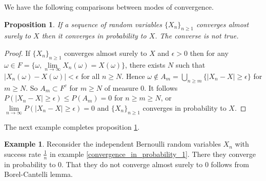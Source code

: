 \documentclass[12pt]{amsart}
\newtheorem{proposition}[theorem]{Proposition}
\theoremstyle{definition}
\newtheorem{example}[theorem]{Example}
\begin{document}
We have the following comparisons between modes of convergence.
\begin{proposition} \label{almost_sure_implies_probability} If  a sequence of random variables $\{X_n\}_{n \geq 1}$ converges almost surely to $X$ then it converges in probability to $X$. The converse is not true.
\end{proposition}
\begin{proof} If $\{X_n\}_{n \geq 1}$ converges almost surely to $X$ and $\epsilon > 0$ then for any $\omega \in F = \{\omega, \lim\limits_{n \to \infty} X_n (\omega) = X(\omega)\}$, there exists $N$ such that $|X_n(\omega) - X(\omega)| < \epsilon$ for all $n \geq N$. Hence $\omega \nin A_m = \bigcup\limits_{n \geq m} \{|X_n - X| \geq \epsilon\}$ for $m \geq N$. So $A_m \subset F^c$ for $m \geq N$ of measure 0. It follows $P(|X_n - X| \geq \epsilon) \leq P(A_m) = 0$ for $n \geq m \geq N$, or $\lim\limits_{n \to \infty} P(|X_n - X| \geq \epsilon) = 0$ and $\{X_n\}_{n \geq 1}$ converges in probability to $X$.  
\end{proof}

The next example completes proposition \ref{almost_sure_implies_probability}.

\begin{example} Reconsider the independent Bernoulli random variables $X_n$ with success rate $\frac{1}{n}$ in example \ref{convergence_in_probability_1}. There they converge in probability to 0. That they do not converge almost surely to 0 follows from Borel-Cantelli lemma.
\end{example}
\end{document}
